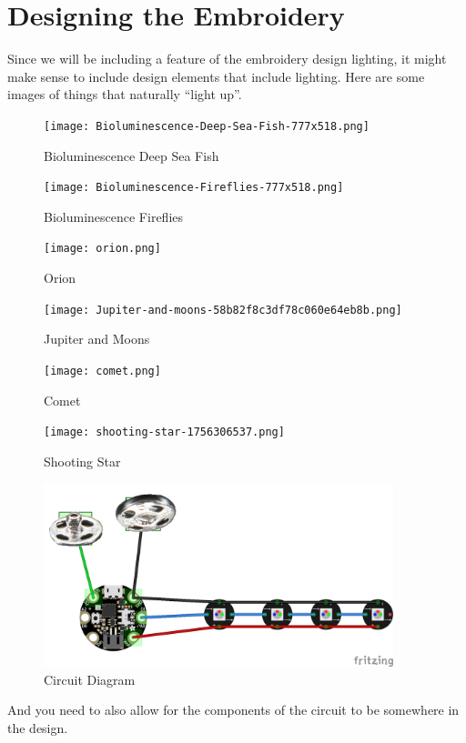 \documentclass[letterpaper,twoside,12pt]{article}
\begin{document}
\part{Designing the Embroidery}
Since we will be including a feature of the embroidery design lighting, it 
might make sense to include design elements that include lighting.  Here are 
some images of things that naturally ``light up''. 
\begin{figure}[hbpt]\begin{centering}%
\texttt{[image: Bioluminescence-Deep-Sea-Fish-777x518.png]}
\caption{Bioluminescence Deep Sea Fish}
\label{fig:biolumfish}
\end{centering}\end{figure}
\begin{figure}[hbpt]\begin{centering}%
\texttt{[image: Bioluminescence-Fireflies-777x518.png]}
\caption{Bioluminescence Fireflies}
\label{fig:biolumflies}
\end{centering}\end{figure}
\clearpage 
\begin{figure}[hbpt]\begin{centering}%
\texttt{[image: orion.png]}
\caption{Orion}
\label{fig:orion}
\end{centering}\end{figure}
\begin{figure}[hbpt]\begin{centering}%
\texttt{[image: Jupiter-and-moons-58b82f8c3df78c060e64eb8b.png]}
\caption{Jupiter and Moons}
\label{fig:jupiterandmoons}
\end{centering}\end{figure}
\clearpage
\begin{figure}[hbpt]\begin{centering}%
\texttt{[image: comet.png]}
\caption{Comet}
\label{fig:comet}
\end{centering}\end{figure}
\begin{figure}[hbpt]\begin{centering}%
\texttt{[image: shooting-star-1756306537.png]}
\caption{Shooting Star}
\label{fig:shootingstar}
\end{centering}\end{figure}
\clearpage
\begin{figure}[hbpt]\begin{centering}%
\includegraphics[width=4in]{CircuitDiagram_bb.png}
\caption{Circuit Diagram}
\label{fig:circuitdiagrame}
\end{centering}\end{figure}
And you need to also allow for the components of the circuit to be somewhere 
in the design.
\end{document}
